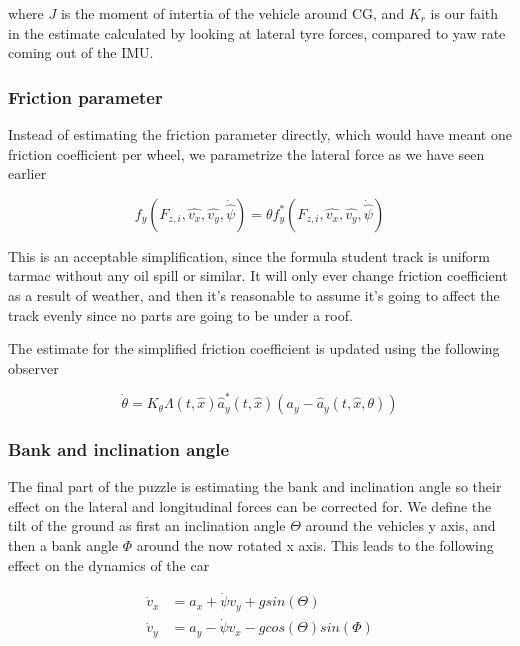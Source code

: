 where $J$ is the moment of intertia of the vehicle around CG, and $K_r$ is our faith in the estimate calculated by looking at lateral tyre forces, compared to yaw rate coming out of the IMU. 

\subsubsection{Friction parameter}
Instead of estimating the friction parameter directly, which would have meant one friction coefficient per wheel, we parametrize the lateral force as we have seen earlier

\begin{equation}
    f_y(F_{z,i}, \hat{v_x}, \hat{v_y}, \dot{\hat{\psi}}) =\theta f_y^*(F_{z,i}, \hat{v_x}, \hat{v_y}, \dot{\hat{\psi}}) 
\end{equation}

This is an acceptable simplification, since the formula student track is uniform tarmac without any oil spill or similar. It will only ever change friction coefficient as a result of weather, and then it's reasonable to assume it's going to affect the track evenly since no parts are going to be under a roof. 

The estimate for the simplified friction coefficient is updated using the following observer

\begin{equation}
    \dot{\theta} = K_{\theta}\Lambda (t, \hat{x})\hat{a}_y^*(t,\hat{x})(a_y - \hat{a}_y(t,\hat{x},\theta))
\end{equation}

\subsubsection{Bank and inclination angle}

The final part of the puzzle is estimating the bank and inclination angle so their effect on the lateral and longitudinal forces can be corrected for. We define the tilt of the ground as first an inclination angle $\Theta$ around the vehicles y axis, and then a bank angle $\Phi$ around the now rotated x axis. This leads to the following effect on the dynamics of the car

\begin{align}
    \dot{v}_x & = a_x + \dot{\psi} v_y + g sin(\Theta) \\
    \dot{v}_y & = a_y - \dot{\psi}v_x - g cos(\Theta) sin(\Phi)
\end{align}

